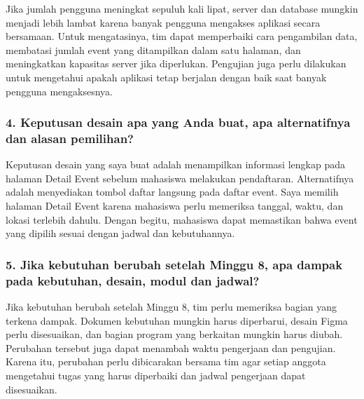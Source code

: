 \documentclass[11pt,a4paper]{article}
\begin{document}
Jika jumlah pengguna meningkat sepuluh kali lipat, server dan database mungkin menjadi lebih lambat karena banyak pengguna mengakses aplikasi secara bersamaan. Untuk mengatasinya, tim dapat memperbaiki cara pengambilan data, membatasi jumlah event yang ditampilkan dalam satu halaman, dan meningkatkan kapasitas server jika diperlukan. Pengujian juga perlu dilakukan untuk mengetahui apakah aplikasi tetap berjalan dengan baik saat banyak pengguna mengaksesnya.



\subsubsection*{4. Keputusan desain apa yang Anda buat, apa alternatifnya dan alasan pemilihan?}

Keputusan desain yang saya buat adalah menampilkan informasi lengkap pada halaman Detail Event sebelum mahasiswa melakukan pendaftaran. Alternatifnya adalah menyediakan tombol daftar langsung pada daftar event. Saya memilih halaman Detail Event karena mahasiswa perlu memeriksa tanggal, waktu, dan lokasi terlebih dahulu. Dengan begitu, mahasiswa dapat memastikan bahwa event yang dipilih sesuai dengan jadwal dan kebutuhannya.



\subsubsection*{5. Jika kebutuhan berubah setelah Minggu 8, apa dampak pada kebutuhan, desain, modul dan jadwal?}

Jika kebutuhan berubah setelah Minggu 8, tim perlu memeriksa bagian yang terkena dampak. Dokumen kebutuhan mungkin harus diperbarui, desain Figma perlu disesuaikan, dan bagian program yang berkaitan mungkin harus diubah. Perubahan tersebut juga dapat menambah waktu pengerjaan dan pengujian. Karena itu, perubahan perlu dibicarakan bersama tim agar setiap anggota mengetahui tugas yang harus diperbaiki dan jadwal pengerjaan dapat disesuaikan.
\end{document}
